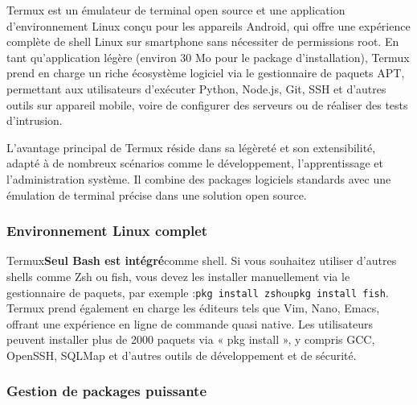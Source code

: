 


Termux est un émulateur de terminal open source et une application d'environnement Linux conçu pour les appareils Android, qui offre une expérience complète de shell Linux sur smartphone sans nécessiter de permissions root. En tant qu'application légère (environ 30 Mo pour le package d'installation), Termux prend en charge un riche écosystème logiciel via le gestionnaire de paquets APT, permettant aux utilisateurs d'exécuter Python, Node.js, Git, SSH et d'autres outils sur appareil mobile, voire de configurer des serveurs ou de réaliser des tests d'intrusion.

L'avantage principal de Termux réside dans sa légèreté et son extensibilité, adapté à de nombreux scénarios comme le développement, l'apprentissage et l'administration système. Il combine des packages logiciels standards avec une émulation de terminal précise dans une solution open source.


\subsubsection*{Environnement Linux complet}

Termux\textbf{Seul Bash est intégré}comme shell. Si vous souhaitez utiliser d'autres shells comme Zsh ou fish, vous devez les installer manuellement via le gestionnaire de paquets, par exemple :\texttt{pkg install zsh}ou\texttt{pkg install fish}. Termux prend également en charge les éditeurs tels que Vim, Nano, Emacs, offrant une expérience en ligne de commande quasi native. Les utilisateurs peuvent installer plus de 2000 paquets via « pkg install », y compris GCC, OpenSSH, SQLMap et d'autres outils de développement et de sécurité.

\subsubsection*{Gestion de packages puissante}

